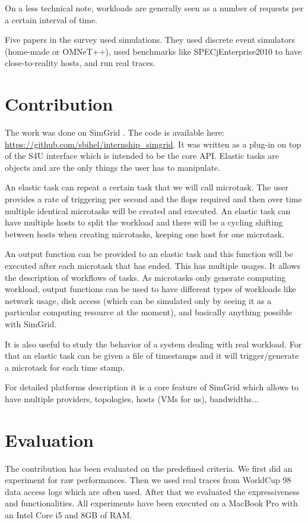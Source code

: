 \documentclass[a4paper]{IEEEtran}
\begin{document}
  On a less technical note, workloads are generally seen as a number of 
  requests per a certain interval of time.
  
  Five papers in the survey used simulations. They used discrete event 
  simulators (home-made or OMNeT++), used benchmarks like SPECjEnterprise2010 
  to have close-to-reality hosts, and run real traces.


\section{Contribution} \label{contrib}
  The work was done on SimGrid \cite{casanova:hal-01017319}. The code is
  available here: \url{https://github.com/sbihel/internship_simgrid}. It was
  written as a plug-in on top of the S4U interface which is intended to be the
  core API. Elastic tasks are objects and are the only things the user has to
  manipulate.
  
  An elastic task can repeat a certain task that we will call microtask. The 
  user provides a rate of triggering per second and the flops required and then 
  over time multiple identical microtasks will be created and executed. An 
  elastic task can have multiple hosts to split the workload and there will be 
  a cycling shifting between hosts when creating microtasks, keeping one host 
  for one microtask.
  
  An output function can be provided to an elastic task and this function will 
  be executed after each microtask that has ended. This has multiple usages. It 
  allows the description of workflows of tasks. As microtasks only generate 
  computing workload, output functions can be used to have different types of 
  workloads like network usage, disk access (which can be simulated only by 
  seeing it as a particular computing resource at the moment), and basically 
  anything possible with SimGrid.
  
  It is also useful to study the behavior of a system dealing with real 
  workload. For that an elastic task can be given a file of timestamps and it 
  will trigger/generate a microtask for each time stamp.
  
  For detailed platforms description it is a core feature of SimGrid which 
  allows to have multiple providers, topologies, hosts (VMs for us), 
  bandwidths...


\section{Evaluation} \label{eval}
  The contribution has been evaluated on the predefined criteria. We first did 
  an experiment for raw performances. Then we used real traces from WorldCup 98 
  data access logs \cite{wc98} which are often used. After that we evaluated 
  the expressiveness and functionalities. All experiments have been executed on 
  a MacBook Pro with an Intel Core i5 and 8GB of RAM.
    
\end{document}
